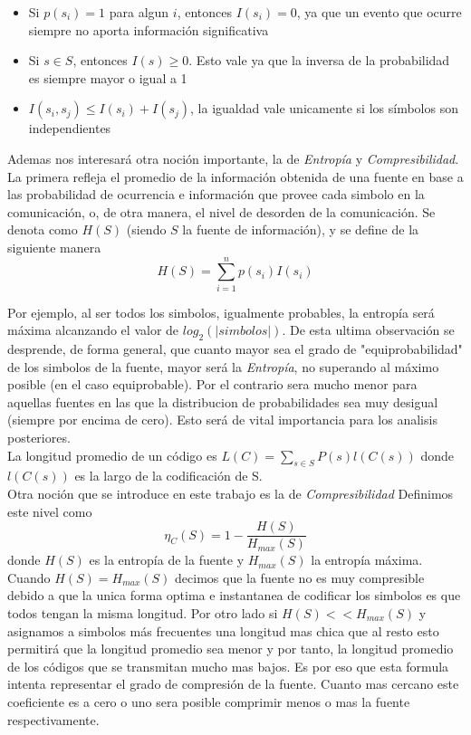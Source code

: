 \begin{itemize}
	\item Si $p(s_i) = 1$ para algun $i$, entonces $I(s_i) = 0$, ya que un evento que ocurre siempre no aporta información significativa
	\item Si $s \in S$, entonces $I(s) \geq 0$. Esto vale ya que la inversa de la probabilidad es siempre mayor o igual a 1
	\item $I(s_i, s_j) \leq I(s_i) + I(s_j)$, la igualdad vale unicamente si los símbolos son independientes
	
\end{itemize}

Ademas nos interesará otra noción importante, la de \textit{Entropía} y \textit{Compresibilidad}. La
primera refleja el promedio de la información obtenida de una fuente en
base a las probabilidad de ocurrencia e información que provee cada simbolo en la
comunicación, o, de otra manera, el nivel de desorden de la comunicación.
Se denota como $H(S)$ (siendo $S$ la fuente de información), y se
define de la siguiente manera 
\begin{equation}
	H(S) = \sum\limits_{i=1}^n p(s_i)I(s_i)
\end{equation}

Por ejemplo, al ser todos los simbolos, igualmente probables,
la entropía será máxima alcanzando el valor de $log_2(\lvert simbolos\rvert)$.
De esta ultima observación se desprende, de forma general, que cuanto mayor sea el grado de
"equiprobabilidad" de los simbolos de la fuente, mayor será la
\textit{Entropía}, no superando al máximo posible (en el caso equiprobable).
Por el contrario sera mucho menor para aquellas fuentes en las
que la distribucion de probabilidades sea muy desigual (siempre por encima de cero).
Esto será de vital importancia para los analisis posteriores.
\\

La longitud promedio de un código es $L(C) = \sum_{s \in S} P(s)l(C(s))$ donde
$l(C(s))$ es la largo de la codificación de S.
\\

Otra noción que se introduce en este trabajo es la de \textit{Compresibilidad}
Definimos este nivel como
\begin{equation}
\eta_{C}(S)=1-\frac{H(S)}{H_{max}(S)}
\end{equation}donde $H(S)$ es la entropía de la
fuente y $H_{max}(S)$ la entropía máxima. Cuando $H(S) = H_{max}(S)$ decimos que
la fuente no es muy compresible debido a que la unica forma optima e instantanea
de codificar los simbolos es que todos tengan la misma longitud. Por otro lado
si $H(S) << H_{max}(S)$ y asignamos a simbolos más frecuentes
una longitud mas chica que al resto esto permitirá que la longitud promedio
sea menor y por tanto, la longitud promedio de los códigos que se transmitan
mucho mas bajos.
Es por eso que esta formula intenta representar el grado de compresión de la fuente.
Cuanto mas cercano este coeficiente es a cero o uno sera posible comprimir menos
o mas la fuente respectivamente.

